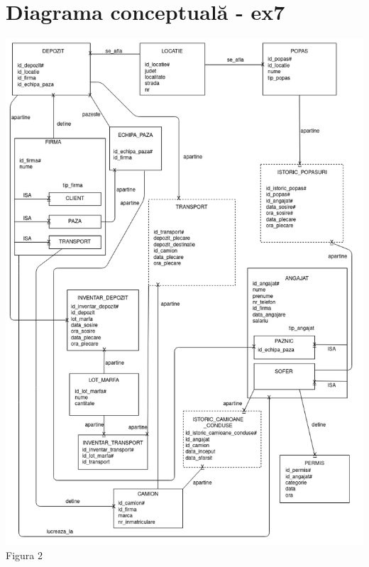 \documentclass[12pt, a4paper]{article}
\begin{document}
\justify

\section{Diagrama conceptuală - ex7}
\includegraphics[width=\textwidth]{_diagrama_conceptuala.png}
\label{Figura 2}
\centering Figura 2

\justify
\end{document}
